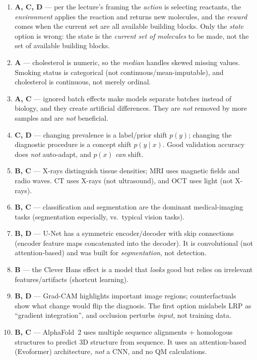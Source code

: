 \documentclass[11pt,oneside]{article}
\begin{document}
\begin{enumerate}[label=\textbf{Q\arabic*.}, leftmargin=3em, itemsep=4pt]
  \item \textbf{A, C, D} --- per the lecture's framing the \emph{action} is selecting reactants, the \emph{environment} applies the reaction and returns new molecules, and the \emph{reward} comes when the current set are all available building blocks. Only the \emph{state} option is wrong: the state is the \emph{current set of molecules} to be made, not the set of available building blocks.
  \item \textbf{A} --- cholesterol is numeric, so the \emph{median} handles skewed missing values. Smoking status is categorical (not continuous/mean-imputable), and cholesterol is continuous, not merely ordinal.
  \item \textbf{A, C} --- ignored batch effects make models separate batches instead of biology, and they create artificial differences. They are \emph{not} removed by more samples and are \emph{not} beneficial.
  \item \textbf{C, D} --- changing prevalence is a label/prior shift $p(y)$; changing the diagnostic procedure is a concept shift $p(y\mid x)$. Good validation accuracy does \emph{not} auto-adapt, and $p(x)$ \emph{can} shift.
  \item \textbf{B, C} --- X-rays distinguish tissue densities; MRI uses magnetic fields and radio waves. CT uses X-rays (not ultrasound), and OCT uses light (not X-rays).
  \item \textbf{B, C} --- classification and segmentation are the dominant medical-imaging tasks (segmentation especially, vs.\ typical vision tasks).
  \item \textbf{B, D} --- U-Net has a symmetric encoder/decoder with skip connections (encoder feature maps concatenated into the decoder). It is convolutional (not attention-based) and was built for \emph{segmentation}, not detection.
  \item \textbf{B} --- the Clever Hans effect is a model that \emph{looks} good but relies on irrelevant features/artifacts (shortcut learning).
  \item \textbf{B, D} --- Grad-CAM highlights important image regions; counterfactuals show what change would flip the diagnosis. The first option mislabels LRP as ``gradient integration'', and occlusion perturbs \emph{input}, not training data.
  \item \textbf{B, C} --- AlphaFold~2 uses multiple sequence alignments + homologous structures to predict 3D structure from sequence. It uses an attention-based (Evoformer) architecture, \emph{not} a CNN, and no QM calculations.

\end{enumerate}
\end{document}
